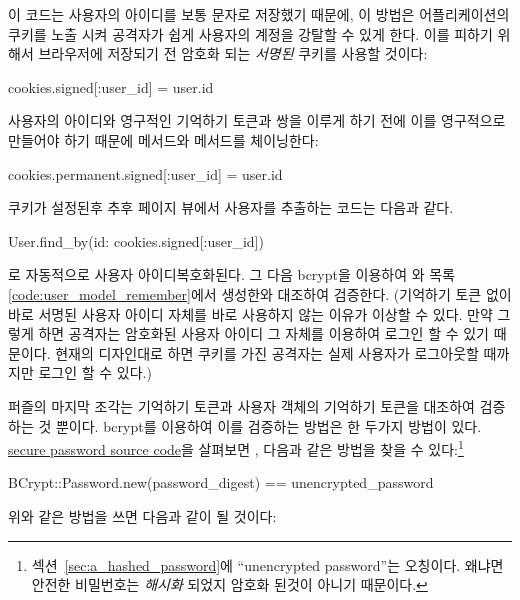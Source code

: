 {{\noindent 이 코드는 사용자의 아이디를 보통 문자로 저장했기 때문에, 이 방법은 어플리케이션의 쿠키를 노출 시켜 공격자가 쉽게 사용자의 계정을 강탈할 수 있게 한다. 이를 피하기 위해서 브라우저에 저장되기 전 암호화 되는 \emph{서명된} 쿠키를 사용할 것이다: 

\begin{code} cookies.signed[:user_id] = user.id \end{code} 

\noindent 사용자의 아이디와 영구적인 기억하기 토큰과 쌍을 이루게 하기 전에 이를 영구적으로 만들어야 하기 때문에  메서드와  메서드를 체이닝한다: 

\begin{code} cookies.permanent.signed[:user_id] = user.id \end{code} 

쿠키가 설정된후 추후 페이지 뷰에서 사용자를 추출하는 코드는 다음과 같다. 

\begin{code} User.find_by(id: cookies.signed[:user_id]) \end{code} 

\noindent {}로 자동적으로 사용자 아이디 복호화된다. 그 다음 bcrypt을 이용하여 와 목록 \ref{code:user_model_remember}에서 생성한와 대조하여 검증한다. (기억하기 토큰 없이 바로 서명된 사용자 아이디 자체를 바로 사용하지 않는 이유가 이상할 수 있다. 만약 그렇게 하면 공격자는 암호화된 사용자 아이디 그 자체를 이용하여 로그인 할 수 있기 때문이다. 현재의 디자인대로 하면 쿠키를 가진 공격자는 실제 사용자가 로그아웃할 때까지만 로그인 할 수 있다.) 

퍼즐의 마지막 조각는 기억하기 토큰과 사용자 객체의 기억하기 토큰을 대조하여 검증하는 것 뿐이다. bcrypt를 이용하여 이를 검증하는 방법은 한 두가지 방법이 있다. \href{https://github.com/rails/rails/blob/master/activemodel/lib/active_model/secure_password.rb}{secure password source code}을 살펴보면 , 다음과 같은 방법을 찾을 수 있다:\footnote{섹션~\ref{sec:a_hashed_password}에 ``unencrypted password''는 오칭이다. 왜냐면 안전한 비밀번호는 \emph{해시화 }되었지 암호화 된것이 아니기 때문이다.} 

\begin{code} BCrypt::Password.new(password_digest) == unencrypted_password \end{code} 

\noindent 위와 같은 방법을 쓰면 다음과 같이 될 것이다: 

}}
